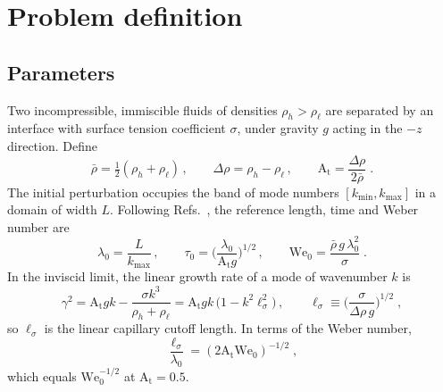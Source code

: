\documentclass[11pt]{article}
\numberwithin{equation}{section}
\newcommand{\At}{\mathrm{A_t}}
\newcommand{\We}{\mathrm{We}_0}
\newcommand{\ls}{\ell_\sigma}
\begin{document}
\section{Problem definition}\label{sec:setup}

\subsection{Parameters}\label{sec:setup:params}
Two incompressible, immiscible fluids of densities $\rho_h > \rho_\ell$ are separated by an interface with surface tension coefficient $\sigma$, under gravity $g$ acting in the $-z$ direction. Define
\begin{equation}\label{eq:params}
\bar\rho = \tfrac12(\rho_h + \rho_\ell) \, , \qquad \Delta \rho = \rho_h - \rho_\ell \, , \qquad \At = \frac{\Delta \rho}{2 \bar\rho} \;.
\end{equation}
The initial perturbation occupies the band of mode numbers $[k_{\min}, k_{\max}]$ in a domain of width $L$. Following Refs.~\cite{Walker2026,Walker2027_1}, the reference length, time and Weber number are
\begin{equation}\label{eq:We0}
\lambda_0 = \frac{L}{k_{\max}} \, , \qquad \tau_0 = \Big(\frac{\lambda_0}{\At g}\Big)^{1/2} \, , \qquad
\We = \frac{\bar\rho \, g \, \lambda_0^2}{\sigma} \;.
\end{equation}
In the inviscid limit, the linear growth rate of a mode of wavenumber $k$ is \cite{Chandrasekhar_book,Sohn2009}
\begin{equation}\label{eq:dispersion}
\gamma^2 = \At g k - \frac{\sigma k^3}{\rho_h + \rho_\ell} = \At g k \, \big(1 - k^2 \ls^2\big) \, , \qquad
\ls \equiv \Big(\frac{\sigma}{\Delta \rho \, g}\Big)^{1/2} \;,
\end{equation}
so $\ls$ is the linear capillary cutoff length. In terms of the Weber number,
\begin{equation}\label{eq:ls_We}
\frac{\ls}{\lambda_0} = (2 \At \We)^{-1/2} \;,
\end{equation}
which equals $\We^{-1/2}$ at $\At = 0.5$.
\end{document}

